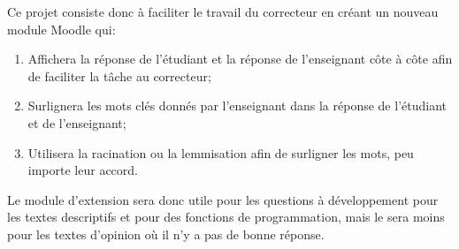 Ce projet consiste donc à faciliter le travail du correcteur en créant un nouveau module Moodle qui:

\begin{enumerate}
  \item Affichera la réponse de l'étudiant et la réponse de l'enseignant côte à côte afin de faciliter la tâche au correcteur;
  \item Surlignera les mots clés donnés par l'enseignant dans la réponse de l'étudiant et de l'enseignant;
  \item Utilisera la racination ou la lemmisation afin de surligner les mots, peu importe leur accord.
\end{enumerate}

Le module d'extension sera donc utile pour les questions à développement pour les textes descriptifs et pour des fonctions de programmation, mais le sera moins pour les textes d'opinion où il n'y a pas de \og bonne \fg{} réponse.
